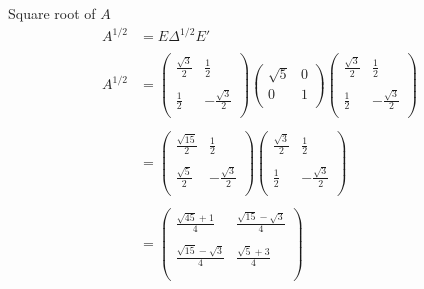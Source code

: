 \documentclass[11pt,a4paper]{article}
\theoremstyle{definition}
\begin{document}
Square root of $A$
\begin{align*}
A^{1/2} & = E\Delta^{1/2}E'\\\\
A^{1/2} & = \begin{pmatrix}
\frac{\sqrt{3}}{2} & \frac{1}{2}\\\\
\frac{1}{2} & -\frac{\sqrt{3}}{2}\\
\end{pmatrix}\begin{pmatrix}
\sqrt{5} & 0\\
0 & 1\\
\end{pmatrix}\begin{pmatrix}
\frac{\sqrt{3}}{2} & \frac{1}{2}\\\\
\frac{1}{2} & -\frac{\sqrt{3}}{2}\\
\end{pmatrix}\\\\
& = \begin{pmatrix}
\frac{\sqrt{15}}{2} & \frac{1}{2}\\\\
\frac{\sqrt{5}}{2} & -\frac{\sqrt{3}}{2}\\
\end{pmatrix}\begin{pmatrix}
\frac{\sqrt{3}}{2} & \frac{1}{2}\\\\
\frac{1}{2} & -\frac{\sqrt{3}}{2}\\
\end{pmatrix}\\\\
& = \begin{pmatrix}
\frac{\sqrt{45} + 1}{4} & \frac{\sqrt{15}-\sqrt{3}}{4}\\\\
\frac{\sqrt{15}-\sqrt{3}}{4} & \frac{\sqrt{5}+3}{4}\\\\
\end{pmatrix}
\end{align*}
\end{document}
